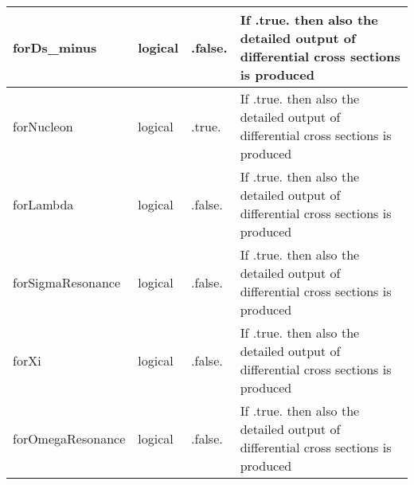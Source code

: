 \documentclass{article}
\begin{document}
\begin{longtable}{llll}
\midrule
forDs\_minus & \begin{minipage}[t]{2cm}logical\end{minipage} & \begin{minipage}[t]{2cm}.false.\end{minipage} & \begin{minipage}[t]{12cm}If .true. then also the detailed output of differential cross sections is produced\end{minipage}\\*
\midrule
forNucleon & \begin{minipage}[t]{2cm}logical\end{minipage} & \begin{minipage}[t]{2cm}.true.\end{minipage} & \begin{minipage}[t]{12cm}If .true. then also the detailed output of differential cross sections is produced\end{minipage}\\*
\midrule
forLambda & \begin{minipage}[t]{2cm}logical\end{minipage} & \begin{minipage}[t]{2cm}.false.\end{minipage} & \begin{minipage}[t]{12cm}If .true. then also the detailed output of differential cross sections is produced\end{minipage}\\*
\midrule
forSigmaResonance & \begin{minipage}[t]{2cm}logical\end{minipage} & \begin{minipage}[t]{2cm}.false.\end{minipage} & \begin{minipage}[t]{12cm}If .true. then also the detailed output of differential cross sections is produced\end{minipage}\\*
\midrule
forXi & \begin{minipage}[t]{2cm}logical\end{minipage} & \begin{minipage}[t]{2cm}.false.\end{minipage} & \begin{minipage}[t]{12cm}If .true. then also the detailed output of differential cross sections is produced\end{minipage}\\*
\midrule
forOmegaResonance & \begin{minipage}[t]{2cm}logical\end{minipage} & \begin{minipage}[t]{2cm}.false.\end{minipage} & \begin{minipage}[t]{12cm}If .true. then also the detailed output of differential cross sections is produced\end{minipage}\\*
\bottomrule
\end{longtable}
{ }
\end{document}
